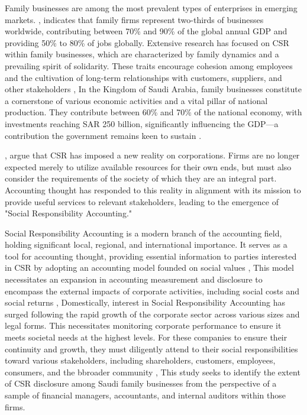 \documentclass{default}
\begin{document}
Family businesses are among the most prevalent types of enterprises in emerging markets. \cite{ref8}, indicates that family firms represent two-thirds of businesses worldwide, contributing between 70\% and 90\% of the global annual GDP and providing 50\% to 80\% of jobs globally. Extensive research has focused on CSR within family businesses, which are characterized by family dynamics and a prevailing spirit of solidarity. These traits encourage cohesion among employees and the cultivation of long-term relationships with customers, suppliers, and other stakeholders \cite{ref6}, In the Kingdom of Saudi Arabia, family businesses constitute a cornerstone of various economic activities and a vital pillar of national production. They contribute between 60\% and 70\% of the national economy, with investments reaching SAR 250 billion, significantly influencing the GDP—a contribution the government remains keen to sustain \cite{ref7} .

\cite{ref2}, argue that CSR has imposed a new reality on corporations. Firms are no longer expected merely to utilize available resources for their own ends, but must also consider the requirements of the society of which they are an integral part. Accounting thought has responded to this reality in alignment with its mission to provide useful services to relevant stakeholders, leading to the emergence of "Social Responsibility Accounting."

Social Responsibility Accounting is a modern branch of the accounting field, holding significant local, regional, and international importance. It serves as a tool for accounting thought, providing essential information to parties interested in CSR by adopting an accounting model founded on social values \cite{ref3}, This model necessitates an expansion in accounting measurement and disclosure to encompass the external impacts of corporate activities, including social costs and social returns \cite{ref4}, Domestically, interest in Social Responsibility Accounting has surged following the rapid growth of the corporate sector across various sizes and legal forms. This necessitates monitoring corporate performance to ensure it meets societal needs at the highest levels. For these companies to ensure their continuity and growth, they must diligently attend to their social responsibilities toward various stakeholders, including shareholders, customers, employees, consumers, and the bbroader community \cite{ref5}, This study seeks to identify the extent of CSR disclosure among Saudi family businesses from the perspective of a sample of financial managers, accountants, and internal auditors within those firms.
\end{document}
